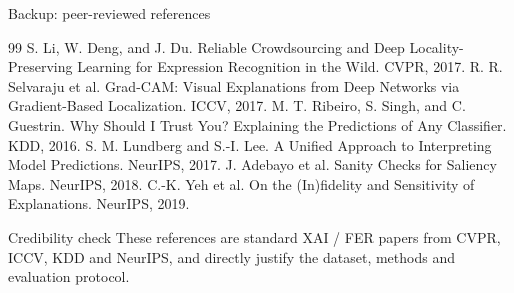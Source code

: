 \documentclass[aspectratio=169,10pt]{beamer}
\begin{document}
\begin{frame}{Backup: peer-reviewed references}
  \scriptsize
  \begin{thebibliography}{99}
     S. Li, W. Deng, and J. Du. Reliable Crowdsourcing and Deep Locality-Preserving Learning for Expression Recognition in the Wild. CVPR, 2017.
     R. R. Selvaraju et al. Grad-CAM: Visual Explanations from Deep Networks via Gradient-Based Localization. ICCV, 2017.
     M. T. Ribeiro, S. Singh, and C. Guestrin. Why Should I Trust You? Explaining the Predictions of Any Classifier. KDD, 2016.
     S. M. Lundberg and S.-I. Lee. A Unified Approach to Interpreting Model Predictions. NeurIPS, 2017.
     J. Adebayo et al. Sanity Checks for Saliency Maps. NeurIPS, 2018.
     C.-K. Yeh et al. On the (In)fidelity and Sensitivity of Explanations. NeurIPS, 2019.
  \end{thebibliography}
  \vspace{0.7em}
  \begin{block}{Credibility check}
    These references are standard XAI / FER papers from CVPR, ICCV, KDD and NeurIPS, and directly justify the dataset, methods and evaluation protocol.
  \end{block}
\end{frame}
\end{document}
